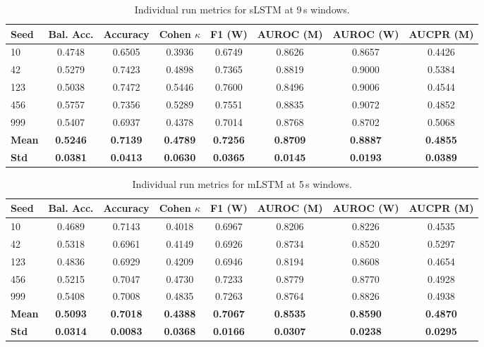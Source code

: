 \begin{table}[htbp]
\centering
\caption{Individual run metrics for sLSTM at 9\,s windows.}
\label{tab:app_metrics_slstm_9s}
\footnotesize
\setlength{\tabcolsep}{2.5pt}
\begin{tabular}{l | c | c | c | c | c | c | c}
\textbf{Seed} & \textbf{Bal. Acc.} & \textbf{Accuracy} & \textbf{Cohen \(\kappa\)} & \textbf{F1 (W)} & \textbf{AUROC (M)} & \textbf{AUROC (W)} & \textbf{AUCPR (M)} \\
\hline
10  & 0.4748 & 0.6505 & 0.3936 & 0.6749 & 0.8626 & 0.8657 & 0.4426 \\
42  & 0.5279 & 0.7423 & 0.4898 & 0.7365 & 0.8819 & 0.9000 & 0.5384 \\
123 & 0.5038 & 0.7472 & 0.5446 & 0.7600 & 0.8496 & 0.9006 & 0.4544 \\
456 & 0.5757 & 0.7356 & 0.5289 & 0.7551 & 0.8835 & 0.9072 & 0.4852 \\
999 & 0.5407 & 0.6937 & 0.4378 & 0.7014 & 0.8768 & 0.8702 & 0.5068 \\
\hline
\textbf{Mean} & \textbf{0.5246} & \textbf{0.7139} & \textbf{0.4789} & \textbf{0.7256} & \textbf{0.8709} & \textbf{0.8887} & \textbf{0.4855} \\
\textbf{Std} & \textbf{0.0381} & \textbf{0.0413} & \textbf{0.0630} & \textbf{0.0365} & \textbf{0.0145} & \textbf{0.0193} & \textbf{0.0389} \\
\hline
\end{tabular}
\setlength{\tabcolsep}{6pt}
\end{table}

\begin{table}[htbp]
\centering
\caption{Individual run metrics for mLSTM at 5\,s windows.}
\label{tab:app_metrics_mlstm_5s}
\footnotesize
\setlength{\tabcolsep}{2.5pt}
\begin{tabular}{l | c | c | c | c | c | c | c}
\textbf{Seed} & \textbf{Bal. Acc.} & \textbf{Accuracy} & \textbf{Cohen \(\kappa\)} & \textbf{F1 (W)} & \textbf{AUROC (M)} & \textbf{AUROC (W)} & \textbf{AUCPR (M)} \\
\hline
10  & 0.4689 & 0.7143 & 0.4018 & 0.6967 & 0.8206 & 0.8226 & 0.4535 \\
42  & 0.5318 & 0.6961 & 0.4149 & 0.6926 & 0.8734 & 0.8520 & 0.5297 \\
123 & 0.4836 & 0.6929 & 0.4209 & 0.6946 & 0.8194 & 0.8608 & 0.4654 \\
456 & 0.5215 & 0.7047 & 0.4730 & 0.7233 & 0.8779 & 0.8770 & 0.4928 \\
999 & 0.5408 & 0.7008 & 0.4835 & 0.7263 & 0.8764 & 0.8826 & 0.4938 \\
\hline
\textbf{Mean} & \textbf{0.5093} & \textbf{0.7018} & \textbf{0.4388} & \textbf{0.7067} & \textbf{0.8535} & \textbf{0.8590} & \textbf{0.4870} \\
\textbf{Std} & \textbf{0.0314} & \textbf{0.0083} & \textbf{0.0368} & \textbf{0.0166} & \textbf{0.0307} & \textbf{0.0238} & \textbf{0.0295} \\
\hline
\end{tabular}
\setlength{\tabcolsep}{6pt}
\end{table}

